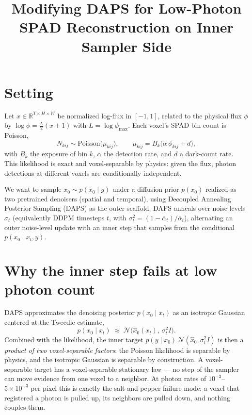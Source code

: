 \documentclass[11pt]{article}
\title{Modifying DAPS for Low-Photon SPAD Reconstruction on Inner Sampler Side}
\author{}
\date{}
\newcommand{\R}{\mathbb{R}}
\begin{document}
\maketitle

\section{Setting}

Let $x \in \R^{T\times H\times W}$ be normalized log-flux in $[-1,1]$, related to the physical flux $\phi$ by $\log\phi = \tfrac{L}{2}(x+1)$ with $L=\log\phi_{\max}$. Each voxel's SPAD bin count is Poisson,
\[
N_{kij} \sim \mathrm{Poisson}\big(\mu_{kij}\big), \qquad \mu_{kij} = B_k\big(\alpha\,\phi_{kij}+d\big),
\]
with $B_k$ the exposure of bin $k$, $\alpha$ the detection rate, and $d$ a dark-count rate. This likelihood is exact and voxel-separable by physics: given the flux, photon detections at different voxels are conditionally independent.

We want to sample $x_0 \sim p(x_0 \mid y)$ under a diffusion prior $p(x_0)$ realized as two pretrained denoisers (spatial and temporal), using Decoupled Annealing Posterior Sampling (DAPS) as the outer scaffold. DAPS anneals over noise levels $\sigma_t$ (equivalently DDPM timesteps $t$, with $\sigma_t^2=(1-\bar\alpha_t)/\bar\alpha_t$), alternating an outer noise-level update with an inner step that samples from the conditional $p(x_0\mid x_t,y)$.

\section{Why the inner step fails at low photon count}

DAPS approximates the denoising posterior $p(x_0\mid x_t)$ as an isotropic Gaussian centered at the Tweedie estimate,
\[
p(x_0\mid x_t) \;\approx\; \mathcal N\big(\hat x_0(x_t),\, \sigma_t^2 I\big).
\]
Combined with the likelihood, the inner target $p(y\mid x_0)\,\mathcal N(\hat x_0,\sigma_t^2 I)$ is then a \emph{product of two voxel-separable factors}: the Poisson likelihood is separable by physics, and the isotropic Gaussian is separable by construction. A voxel-separable target has a voxel-separable stationary law — no step of the sampler can move evidence from one voxel to a neighbor. At photon rates of $10^{-3}$–$5\times10^{-3}$ per pixel this is exactly the salt-and-pepper failure mode: a voxel that registered a photon is pulled up, its neighbors are pulled down, and nothing couples them.
\end{document}
